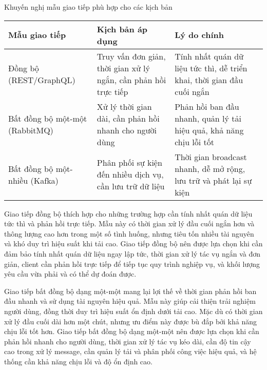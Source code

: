 \begin{table}[H]{Khuyến nghị mẫu giao tiếp phù hợp cho các kịch bản}
    \centering
    {\setlength{\arrayrulewidth}{1pt}
        \renewcommand{\arraystretch}{1.5}
        \setlength{\tabcolsep}{6pt}
        \begin{tabular}{|p{3.2cm}|p{3.2cm}|p{4.6cm}|}
            \hline
            \textbf{Mẫu giao tiếp}         & \textbf{Kịch bản áp dụng}                                       & \textbf{Lý do chính}                                                     \\
            \hline
            Đồng bộ (REST/GraphQL)         & Truy vấn đơn giản, thời gian xử lý ngắn, cần phản hồi trực tiếp & Tính nhất quán dữ liệu tức thì, dễ triển khai, thời gian đầu cuối ngắn \\
            \hline
            Bất đồng bộ một-một (RabbitMQ) & Xử lý thời gian dài, cần phản hồi nhanh cho người dùng          & Phản hồi ban đầu nhanh, quản lý tải hiệu quả, khả năng chịu lỗi tốt      \\
            \hline
            Bất đồng bộ một-nhiều (Kafka)  & Phân phối sự kiện đến nhiều dịch vụ, cần lưu trữ dữ liệu        & Thời gian broadcast nhanh, dễ mở rộng, lưu trữ và phát lại sự kiện       \\
            \hline
        \end{tabular}}
\end{table}

Giao tiếp đồng bộ thích hợp cho những trường hợp cần tính nhất quán dữ liệu tức thì và phản hồi trực tiếp. Mẫu này có thời gian xử lý đầu cuối ngắn hơn và thông lượng cao hơn trong một số tình huống, nhưng tiêu tốn nhiều tài nguyên và khó duy trì hiệu suất khi tải cao. Giao tiếp đồng bộ nên được lựa chọn khi cần đảm bảo tính nhất quán dữ liệu ngay lập tức, thời gian xử lý tác vụ ngắn và đơn giản, client cần phản hồi trực tiếp để tiếp tục quy trình nghiệp vụ, và khối lượng yêu cầu vừa phải và có thể dự đoán được.

Giao tiếp bất đồng bộ dạng một-một mang lại lợi thế về thời gian phản hồi ban đầu nhanh và sử dụng tài nguyên hiệu quả. Mẫu này giúp cải thiện trải nghiệm người dùng, đồng thời duy trì hiệu suất ổn định dưới tải cao. Mặc dù có thời gian xử lý đầu cuối dài hơn một chút, nhưng ưu điểm này được bù đắp bởi khả năng chịu lỗi tốt hơn. Giao tiếp bất đồng bộ dạng một-một nên được lựa chọn khi cần phản hồi nhanh cho người dùng, thời gian xử lý tác vụ kéo dài, cần độ tin cậy cao trong xử lý message, cần quản lý tải và phân phối công việc hiệu quả, và hệ thống cần khả năng chịu lỗi và độ ổn định cao.

